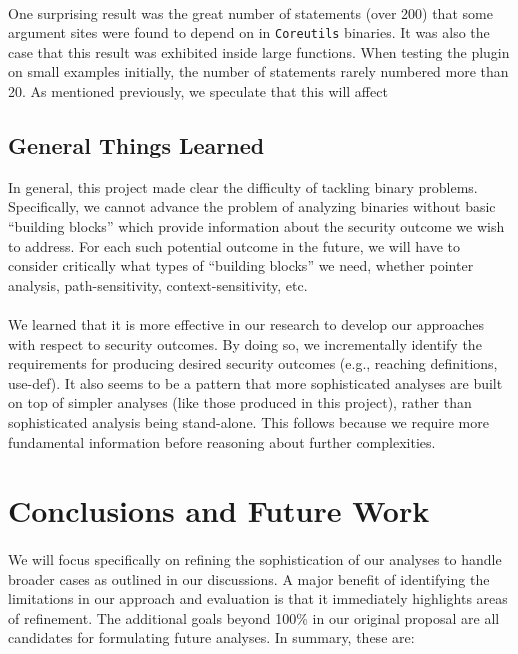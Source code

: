 \documentclass[letterpaper,11pt]{article}
\begin{document}
\paragraph{}
One surprising result was the great number of statements (over
200) that some argument sites were found to depend on in \texttt{Coreutils}
binaries. It was also the case that this result was exhibited inside large
functions. When testing the plugin on small examples initially, the number of
statements rarely numbered more than 20. As mentioned previously, we speculate
that this will affect

\subsection{General Things Learned}

In general, this project made clear the difficulty of tackling binary
problems. Specifically, we cannot advance the problem of analyzing binaries
without basic ``building blocks'' which provide information about the security
outcome we wish to address. For each such potential outcome in the future,
we will have to consider critically what types of ``building blocks'' we need,
whether pointer analysis, path-sensitivity, context-sensitivity, etc.

\paragraph{}
We learned that it is more effective in our research to develop our approaches
with respect to security outcomes. By doing so, we incrementally identify the
requirements for producing desired security outcomes (e.g., reaching
definitions, use-def). It also seems to be a pattern that more sophisticated
analyses are built on top of simpler analyses (like those produced in this
project), rather than sophisticated analysis being stand-alone. This follows
because we require more fundamental information before reasoning about
further complexities.

\section{Conclusions and Future Work}
\paragraph{}
We will focus specifically on refining the sophistication of our analyses
to handle broader cases as outlined in our discussions. A major benefit of
identifying the limitations in our approach and evaluation is that it
immediately highlights areas of refinement. The additional goals beyond 100\%
in our original proposal are all candidates for formulating future analyses.
In summary, these are:
\end{document}
